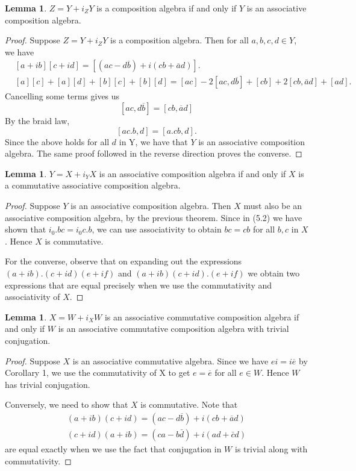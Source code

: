 \documentclass[11pt]{report}
\theoremstyle{plain}
\theoremstyle{definition}
\newtheorem{lemma}[theorem]{Lemma}
\begin{document}
\begin{lemma}
	$ Z = Y + i_Z Y  $ is a composition algebra if and only if $ Y  $ is an associative composition algebra.
\end{lemma}
\begin{proof}
Suppose $ Z = Y + i_Z Y$ is a composition algebra. Then for all $ a, b,c,d \in Y $, we have 
\begin{align*}
&[a+ib][c+id] = [(ac-d\overline{b}) + i(cb + \overline{a}d)].\\
&[a][c]+[a][d]+[b][c]+[b][d] = [ac] - 2[ac,d\overline{b}] + [cb] + 2[cb,\bar{a}d]+[ad].
\end{align*}
Cancelling some terms gives us
$$ [ac,d\overline{b}] = [cb,\overline{a}d] $$
By the braid law,
$$[ac.b,d] = [a.cb,d].$$
Since the above holds for all $ d $ in Y, we have that $ Y $ is an associative composition algebra. The same proof followed in the reverse direction proves the converse.
\end{proof}
\begin{lemma}
	$ Y = X + i_Y X $ is an associative composition algebra if and only if $ X $ is a commutative associative composition algebra.
\end{lemma}
\begin{proof}
Suppose $ Y $ is an associative composition algebra. Then $ X $ must also be an associative composition algebra, by the previous theorem. Since in (5.2) we have shown that $ i_0.bc = i_0c.b $, we can use associativity to obtain $ bc = cb  $ for all $ b,c $ in $ X $. Hence $ X $ is commutative.

For the converse, observe that on expanding out the expressions $ (a+ib).(c+id)(e+if) $ and $ (a+ib)(c+id).(e+if) $ we obtain two expressions that are equal precisely when we use the commutativity and associativity of $ X $.

\end{proof}
\begin{lemma}
	$ X = W + i_X W $ is an associative commutative composition algebra if and only if $ W $ is an associative commutative composition algebra with trivial conjugation.
\end{lemma}
\begin{proof}
	Suppose $ X $ is an associative commutative algebra. Since we have $ ei = i\overline{e} $ by Corollary 1, we use the commutativity of X to get $ e = \overline{e} $ for all $ e \in W. $ Hence $ W $ has trivial conjugation.
	
	Conversely, we need to show that $ X $ is commutative. Note that
	\begin{align*}
	(a+ib)(c+id) = (ac-d\overline{b}) + i(cb + \overline{a}d)\\
	(c+id)(a+ib) = (ca-b\bar{d})+i(ad+\bar{c}d)
	\end{align*}
	are equal exactly when we use the fact that conjugation in $ W $ is trivial along with commutativity.
\end{proof}
\end{document}

